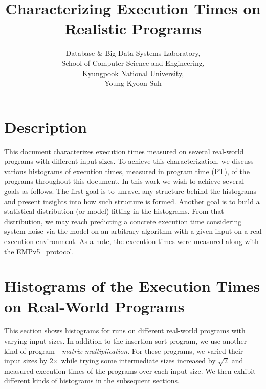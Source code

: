 \documentclass[10pt]{article}
\begin{document}
\title{Characterizing Execution Times on Realistic Programs}

\author{
Database \& Big Data Systems Laboratory,\\
School of Computer Science and Engineering, \\
Kyungpook National University,\\
Young-Kyoon Suh\\
}
\maketitle

\section{Description}
This document characterizes execution times 
measured on several real-world programs with different input sizes. 
To achieve this characterization, we discuss 
various histograms of execution times, measured in program time (PT), of the programs throughout this document. 
In this work we wish to achieve several goals as follows. 
The first goal is to unravel any structure behind the histograms and present insights into how such structure is formed. 
Another goal is to build a statistical distribution (or model) fitting in the histograms. 
From that distribution, we may reach predicting a concrete execution time considering system noise via 
the model on an arbitrary algorithm with a given input on a real execution environment. 
As a note, the execution times were measured along with the EMPv5~\cite{EMP} protocol. 


\section{Histograms of the Execution Times on Real-World Programs~\label{sec:real-world}} 
This section shows histograms for runs on 
different real-world programs with varying input sizes.  
In addition to the insertion sort program, we use another kind of program---{\it matrix multiplication}.
For these programs, we varied their input sizes by 2{\small $\times$} while trying some intermediate sizes increased by $\sqrt{2}$ and measured execution times of the programs over each input size. We then exhibit different kinds of histograms in the subsequent sections.
\end{document}
